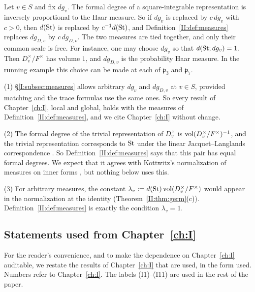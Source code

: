 \begin{example}\label{II:ex:measures}
Let $v\in S$ and fix $dg_v$. The formal degree of a square-integrable representation is inversely proportional to the Haar measure. So if $dg_v$ is replaced by $c\,dg_v$ with $c>0$, then $d(\mathrm{St})$ is replaced by $c^{-1}d(\mathrm{St})$, and Definition~\ref{II:def:measures} replaces $dg_{D,v}$ by $c\,dg_{D,v}$. The two measures are tied together, and only their common scale is free. For instance, one may choose $dg_v$ so that $d(\mathrm{St};dg_v)=1$. Then $D_v^\times/F^\times$ has volume $1$, and $dg_{D,v}$ is the probability Haar measure. In the running example this choice can be made at each of $\mathfrak p_3$ and $\mathfrak p_7$.
\end{example}


\begin{remark}\label{II:rem:measures}
(1) \S\ref{I:subsec:measures} allows arbitrary $dg_v$ and $dg_{D,v}$ at $v\in S$, provided matching and the trace formulas use the same ones. So every result of Chapter~\ref{ch:I}, local and global, holds with the measures of Definition~\ref{II:def:measures}, and we cite Chapter~\ref{ch:I} without change.

(2) The formal degree of the trivial representation of $D_v^\times$ is $\operatorname{vol}(D_v^\times/F^\times)^{-1}$, and the trivial representation corresponds to $\mathrm{St}$ under the linear Jacquet--Langlands correspondence \cite[Theorem~2.2]{Bad08}. So Definition~\ref{II:def:measures} says that this pair has equal formal degrees. We expect that it agrees with Kottwitz's normalization of measures on inner forms \cite{Kot88}, but nothing below uses this.

(3) For arbitrary measures, the constant $\lambda_v:=d(\mathrm{St})\operatorname{vol}(D_v^\times/F^\times)$ would appear in the normalization at the identity (Theorem~\ref{II:thm:germ}(c)). Definition~\ref{II:def:measures} is exactly the condition $\lambda_v=1$.
\end{remark}

\subsection{Statements used from Chapter~\ref{ch:I}}\label{II:subsec:fromPartI}
For the reader's convenience, and to make the dependence on Chapter~\ref{ch:I} auditable, we restate the results of Chapter~\ref{ch:I} that are used, in the form used. Numbers refer to Chapter~\ref{ch:I}. The labels (I1)--(I11) are used in the rest of the paper.

